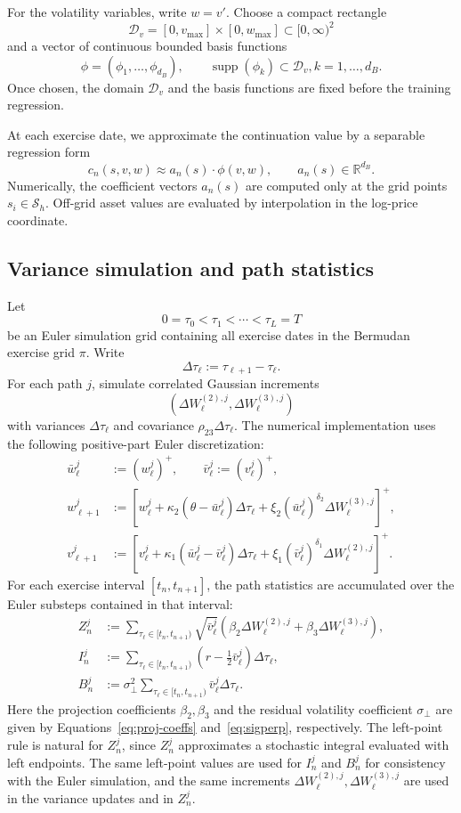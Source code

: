 \documentclass[pdflatex,sn-mathphys-num]{sn-jnl}
\theoremstyle{thmstyleone}%
\theoremstyle{thmstylethree}%
\theoremstyle{thmstyletwo}%
\newcommand{\R}{\mathbb R}
\providecommand{\supp}{\operatorname{supp}}
\begin{document}
For the volatility variables, write $w=v'$. Choose a compact rectangle
$$
\mathcal D_v=[0,v_{\max}]\times[0,w_{\max}]\subset[0,\infty)^2
$$
and a vector of continuous bounded basis functions
$$
\phi=(\phi_1,\ldots,\phi_{d_B}),
\qquad
\supp(\phi_k)\subset \mathcal D_v, k=1, \ldots, d_B.
$$
Once chosen, the domain $\mathcal D_v$ and the basis functions are fixed before
the training regression.

At each exercise date, we approximate the continuation value by a separable
regression form
$$
c_n(s,v,w)\approx a_n(s)\cdot\phi(v,w),
\qquad
a_n(s)\in\R^{d_B}.
$$
Numerically, the coefficient vectors $a_n(s)$ are computed only at the grid points
$s_i\in\mathcal S_h$. Off-grid asset values are evaluated by interpolation in the
log-price coordinate.

\subsection{Variance simulation and path statistics}
Let
$$
0=\tau_0<\tau_1<\cdots<\tau_L=T
$$
be an Euler simulation grid containing all exercise dates in the Bermudan exercise grid $\pi$. Write
$$
\Delta\tau_\ell:=\tau_{\ell+1}-\tau_\ell.
$$
For each path $j$, simulate correlated Gaussian increments
$$
(\Delta W_{\ell}^{(2),j},\Delta W_{\ell}^{(3),j})
$$
with variances $\Delta\tau_\ell$ and covariance
$\rho_{23}\Delta\tau_\ell$. The numerical implementation uses the following
positive-part Euler discretization:
$$
\begin{aligned}
\bar w_\ell^j&:=(w_\ell^j)^+,
\qquad
\bar v_\ell^j:=(v_\ell^j)^+,\\
w_{\ell+1}^j
&:=
\left[
w_\ell^j+\kappa_2(\theta-\bar w_\ell^j)\Delta\tau_\ell
+\xi_2(\bar w_\ell^j)^{\delta_2}\Delta W_{\ell}^{(3),j}
\right]^+,\\
v_{\ell+1}^j
&:=
\left[
v_\ell^j+\kappa_1(\bar w_\ell^j-\bar v_\ell^j)\Delta\tau_\ell
+\xi_1(\bar v_\ell^j)^{\delta_1}\Delta W_{\ell}^{(2),j}
\right]^+.
\end{aligned}
$$
For each exercise interval $[t_n,t_{n+1}]$, the path statistics are accumulated
over the Euler substeps contained in that interval:
$$
\begin{aligned}
Z_n^j
&:=
\sum_{\tau_\ell\in[t_n,t_{n+1})}
\sqrt{\bar v_\ell^j}
\left(
\beta_2\Delta W_{\ell}^{(2),j}
+
\beta_3\Delta W_{\ell}^{(3),j}
\right),\\
I_n^j
&:=
\sum_{\tau_\ell\in[t_n,t_{n+1})}
\left(r-\frac12\bar v_\ell^j\right)\Delta\tau_\ell,\\
B_n^j
&:=
\sigma_\perp^2
\sum_{\tau_\ell\in[t_n,t_{n+1})}
\bar v_\ell^j\Delta\tau_\ell .
\end{aligned}
$$
Here the projection coefficients $\beta_2,\beta_3$ and the residual volatility coefficient $\sigma_\perp$ are given by Equations~\eqref{eq:proj-coeffs} and~\eqref{eq:sigperp}, respectively.
The left-point rule is natural for $Z_n^j$, since $Z_n^j$ approximates a
stochastic integral evaluated with left endpoints. The same left-point values
are used for $I_n^j$ and $B_n^j$ for consistency with the Euler simulation, and
the same increments
$\Delta W_{\ell}^{(2),j},\Delta W_{\ell}^{(3),j}$ are used in the variance
updates and in $Z_n^j$.
\end{document}
